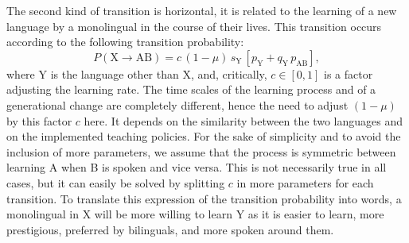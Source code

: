 \documentclass[../thesis.tex]{subfiles}
\begin{document}
The second kind of transition is horizontal, it is related to the learning of a new
language by a monolingual in the course of their lives. This transition occurs according
to the following transition probability:
\begin{equation}
    P (\text{X} \rightarrow \text{AB}) = c \, (1 - \mu) \, s_\text{Y} \, \left[ p_\text{Y} + q_\text{Y} \,  p_{\text{AB}} \right],
\end{equation}
where Y is the language other than X, and, critically, $c \in [0, 1]$ is a factor
adjusting the learning rate. The time scales of the learning process and of a
generational change are completely different, hence the need to adjust $(1-\mu)$ by this
factor $c$ here. It depends on the similarity between the two languages and on the
implemented teaching policies. For the sake of simplicity and to avoid the inclusion of
more parameters, we assume that the process is symmetric between learning A when B is
spoken and vice versa. This is not necessarily true in all cases, but it can easily be
solved by splitting $c$ in more parameters for each transition. To translate this
expression of the transition probability into words, a monolingual in X will be more
willing to learn Y as it is easier to learn, more prestigious, preferred by bilinguals,
and more spoken around them.
\end{document}
